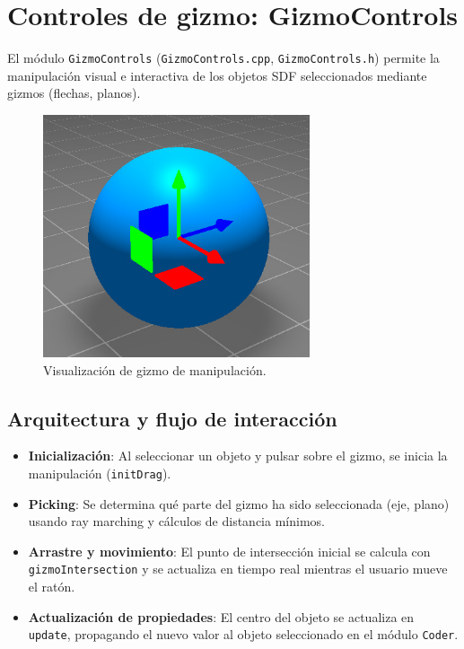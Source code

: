 \section{Controles de gizmo: GizmoControls}

El módulo \texttt{GizmoControls} (\texttt{GizmoControls.cpp},
\texttt{GizmoControls.h}) permite la manipulación visual e interactiva de los
objetos SDF seleccionados mediante gizmos (flechas, planos).

\begin{figure}[H]
	\centering
	\includegraphics[width=0.7\textwidth]{imagenes/gizmo.jpg}
	\caption{Visualización de gizmo de manipulación.}
\end{figure}

\subsection{Arquitectura y flujo de interacción}

\begin{itemize}
    \item \textbf{Inicialización}: Al seleccionar un objeto y pulsar sobre el gizmo, se inicia la manipulación (\texttt{initDrag}).
    \item \textbf{Picking}: Se determina qué parte del gizmo ha sido seleccionada (eje, plano) usando ray marching y cálculos de distancia mínimos.
    \item \textbf{Arrastre y movimiento}: El punto de intersección inicial se calcula con \texttt{gizmoIntersection} y se actualiza en tiempo real mientras el usuario mueve el ratón.
    \item \textbf{Actualización de propiedades}: El centro del objeto se actualiza en \texttt{update}, propagando el nuevo valor al objeto seleccionado en el módulo \texttt{Coder}.
\end{itemize}


